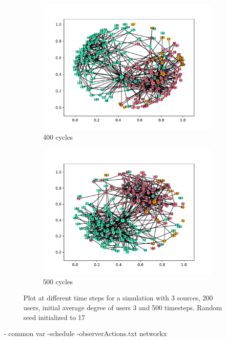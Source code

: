 \begin{figure}
  \begin{subfigure}[t]{.45\textwidth}
    \centering
    \includegraphics[trim={1cm .5cm 1cm 1cm}, clip, width=\linewidth]{img/pdf/plot-0400.pdf} 
    \caption{400 cycles} \label{fig:300}
  \end{subfigure}
  \begin{subfigure}[t]{.45\textwidth}
    \centering
    \includegraphics[trim={1cm .5cm 1cm 1cm}, clip, width=\linewidth]{img/pdf/plot-0500.pdf} 
    \caption{500 cycles} \label{fig:400}
  \end{subfigure}
 
  \caption{Plot at different time steps for a simulation with 3 sources, 200 users, initial average degree of users 3 and 500 timesteps. Random seed initialized to 17}
\end{figure}

- common var
-schedule
-observerActions.txt
networkx
